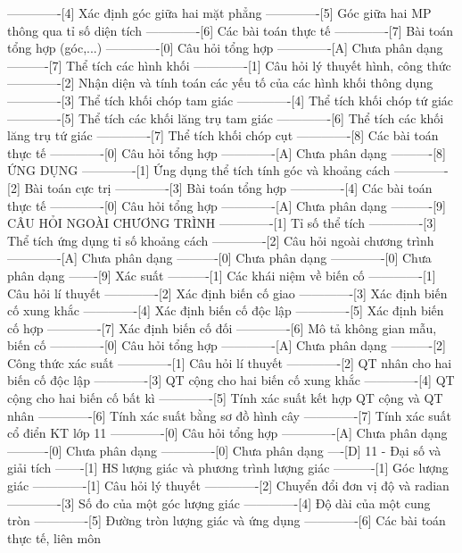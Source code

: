 -------------[4] Xác định góc giữa hai mặt phẳng
-------------[5] Góc giữa hai MP thông qua tỉ số diện tích
-------------[6] Các bài toán thực tế
-------------[7] Bài toán tổng hợp (góc,...)
-------------[0] Câu hỏi tổng hợp
-------------[A] Chưa phân dạng
----------[7] Thể tích các hình khối
-------------[1] Câu hỏi lý thuyết hình, công thức
-------------[2] Nhận diện và tính toán các yếu tố của các hình khối thông dụng
-------------[3] Thể tích khối chóp tam giác
-------------[4] Thể tích khối chóp tứ giác
-------------[5] Thể tích các khối lăng trụ tam giác
-------------[6] Thể tích các khối lăng trụ tứ giác
-------------[7] Thể tích khối chóp cụt
-------------[8] Các bài toán thực tế
-------------[0] Câu hỏi tổng hợp
-------------[A] Chưa phân dạng
----------[8] ỨNG DỤNG
-------------[1] Ứng dụng thể tích tính góc và khoảng cách
-------------[2] Bài toán cực trị
-------------[3] Bài toán tổng hợp
-------------[4] Các bài toán thực tế
-------------[0] Câu hỏi tổng hợp
-------------[A] Chưa phân dạng
----------[9] CÂU HỎI NGOÀI CHƯƠNG TRÌNH
-------------[1] Tỉ số thể tích
-------------[3] Thể tích ứng dụng tỉ số khoảng cách
-------------[2] Câu hỏi ngoài chương trình
-------------[A] Chưa phân dạng
----------[0] Chưa phân dạng
-------------[0] Chưa phân dạng
-------[9] Xác suất
----------[1] Các khái niệm về biến cố
-------------[1] Câu hỏi lí thuyết
-------------[2] Xác định biến cố giao
-------------[3] Xác định biến cố xung khắc
-------------[4] Xác định biến cố độc lập
-------------[5] Xác định biến cố hợp
-------------[7] Xác định biến cố đối
-------------[6] Mô tả không gian mẫu, biến cố
-------------[0] Câu hỏi tổng hợp
-------------[A] Chưa phân dạng
----------[2] Công thức xác suất
-------------[1] Câu hỏi lí thuyết
-------------[2] QT nhân cho hai biến cố độc lập
-------------[3] QT cộng cho hai biến cố xung khắc
-------------[4] QT cộng cho hai biến cố bất kì
-------------[5] Tính xác suất kết hợp QT cộng và QT nhân
-------------[6] Tính xác suất bằng sơ đồ hình cây
-------------[7] Tính xác suất cổ điển KT lớp 11
-------------[0] Câu hỏi tổng hợp
-------------[A] Chưa phân dạng
----------[0] Chưa phân dạng
-------------[0] Chưa phân dạng
----[D] 11 - Đại số và giải tích
-------[1] HS lượng giác và phương trình lượng giác
----------[1] Góc lượng giác
-------------[1] Câu hỏi lý thuyết
-------------[2] Chuyển đổi đơn vị độ và radian
-------------[3] Số đo của một góc lượng giác
-------------[4] Độ dài của một cung tròn
-------------[5] Đường tròn lượng giác và ứng dụng
-------------[6] Các bài toán thực tế, liên môn

